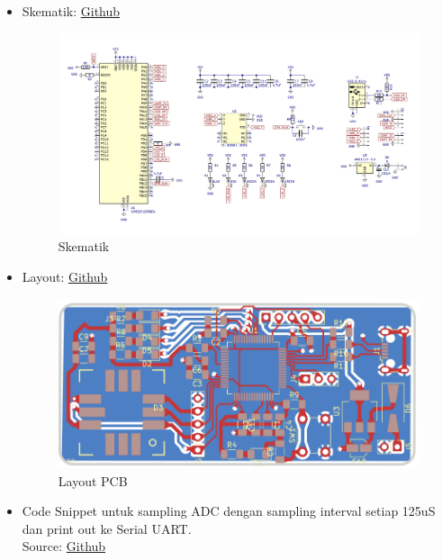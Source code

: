 \documentclass{book} %
\begin{document}
	\begin{itemize}
		\item Skematik: \href{https://github.com/VibrasticLab/wesel_monitoring/blob/master/circuit/mems_vibs/mems_vibs.kicad_sch}{Github}
		
		\begin{figure}[!ht]
			\centering
			\includegraphics[width=\textwidth]{images/mems_vibs-sch.png}
			\caption{Skematik}
		\end{figure}
		
		\newpage
		\item Layout: \href{https://github.com/VibrasticLab/wesel_monitoring/blob/master/circuit/mems_vibs/mems_vibs.kicad_pcb}{Github}
		
		\begin{figure}[!ht]
			\centering
			\includegraphics[width=\textwidth]{images/mems_vibs-brd.png}
			\caption{Layout PCB}
		\end{figure}
	
		\item Code Snippet untuk sampling ADC dengan sampling interval setiap 125uS dan print out ke Serial UART.\\
		Source: \href{https://github.com/VibrasticLab/wesel_monitoring/blob/master/firmware/vib/vib_analog.c#L42-L64}{Github}


\end{itemize}
\end{document}

